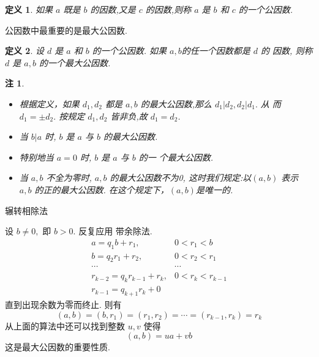 \documentclass[13pt,fontset=mac]{ctexbeamer}
\newtheorem*{defi}{定义}
\newtheorem*{rem}{注}
\begin{document}
\begin{frame}
\begin{defi}
如果 $a$ 既是 $b$ 的因数,又是 $c$ 的因数,则称 $a$ 是 $b$ 和 $c$ 的一个\alert{公因数}.
\end{defi}
公因数中最重要的是最大公因数.

\begin{defi}
设 $d$ 是 $a$ 和 $b$ 的一个公因数. 如果 $a, b $的任一个因数都是 $d$ 的
因数, 则称 $d$ 是 $a, b$ 的一个\alert{最大公因数}.
\end{defi}

\begin{rem}
	\begin{itemize}
\item 根据定义，如果 $d_{1}, d_{2}$ 都是 $a, b$ 的最大公因数,那么 $d_{1}\left|d_{2}, d_{2}\right| d_{1} .$ 从
而 $d_{1}=\pm d_{2} .$ 
按规定 $d_{1}, d_{2}$ 皆非负,故 $d_{1}=d_{2}$.

\item 当 $b | a$ 时, $b$ 是 $a$ 与 $b$ 的最大公因数.

\item 特别地当 $a=0$ 时, $b$ 是 $a$ 与 $b$ 的一 个最大公因数.
 
\item 当 $a, b$  不全为零时, $a,b$ 的最大公因数不为0,  这时我们规定:以$(a, b)$ 表示 $a, b$ 的正的最大公因数. 在这个规定下，$(a, b)$是唯一的. 
\end{itemize}
\end{rem}
\end{frame}

\begin{frame}{辗转相除法}

设 $b \neq 0,$ 即 $b>0 .$ 反复应用 带余除法. 
	\[
	\begin{array}{cc}
	a=q_{1} b+r_{1}, & 0<r_{1}<b \\
	b=q_{2} r_{1}+r_{2}, & 0<r_{2}<r_{1} \\
	\cdots  & \cdots  \\
	r_{k-2}=q_{k} r_{k-1}+r_{k}, & 0<r_{k}<r_{k-1} \\
	r_{k-1}=q_{k+1} r_{k}+0
	\end{array}
	\]
	直到出现余数为零而终止. 则有
	\[
	(a, b)=\left(b, r_{1}\right)=\left(r_{1}, r_{2}\right)=\cdots=\left(r_{k-1}, r_{k}\right)=r_{k}
	\]
	从上面的算法中还可以找到整数 $u, v$ 使得
	\[
	(a, b)=u a+v b
	\]
	这是最大公因数的重要性质.
\end{frame}
\end{document}
